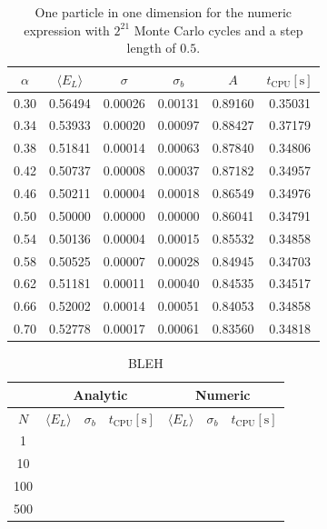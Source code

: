 \documentclass[
    a4paper, aps, twocolumn, floatfix, superscriptaddress, nofootinbib]{revtex4-1}
\newcommand{\1}{\mathds{1}}
\begin{document}
    \begin{table}
        \centering
        \caption{One particle in one dimension for the numeric expression with
        $2^{21}$ Monte Carlo cycles and a step length of $0.5$.}
        \begin{ruledtabular}
            \begin{tabular}{cccccc}
                $\alpha$ & $\langle  E_L\rangle$ & $\sigma$ & $\sigma_b$
                & $A$&$t_{\text{CPU}} [\si{\second}]$ \\
                \hline
                0.30&0.56494&0.00026&0.00131&0.89160&0.35031\\
                0.34&0.53933&0.00020&0.00097&0.88427&0.37179\\
                0.38&0.51841&0.00014&0.00063&0.87840&0.34806\\
                0.42&0.50737&0.00008&0.00037&0.87182&0.34957\\
                0.46&0.50211&0.00004&0.00018&0.86549&0.34976\\
                0.50&0.50000&0.00000&0.00000&0.86041&0.34791\\
                0.54&0.50136&0.00004&0.00015&0.85532&0.34858\\
                0.58&0.50525&0.00007&0.00028&0.84945&0.34703\\
                0.62&0.51181&0.00011&0.00040&0.84535&0.34517\\
                0.66&0.52002&0.00014&0.00051&0.84053&0.34858\\
                0.70&0.52778&0.00017&0.00061&0.83560&0.34818\\
            \end{tabular}
        \end{ruledtabular}
        \label{tab:1D1N_numeric}
    \end{table}

    \begin{table}
        \centering
        \caption{BLEH}
        \begin{ruledtabular}
            \begin{tabular}{c|ccc|ccc}
                & \multicolumn{3}{c|}{Analytic}
                & \multicolumn{3}{c}{Numeric} \\
                \hline
                $N$
                & $\langle E_L\rangle$ & $\sigma_b$
                & $t_{\text{CPU}} [\si{\second}]$
                & $\langle E_L\rangle$ & $\sigma_b$
                & $t_{\text{CPU}} [\si{\second}]$ \\
                \hline
                1  \\
                10 \\
                100 \\
                500
            \end{tabular}
        \end{ruledtabular}
        \label{tab:initial_optimum_comparison}
    \end{table}
\end{document}

